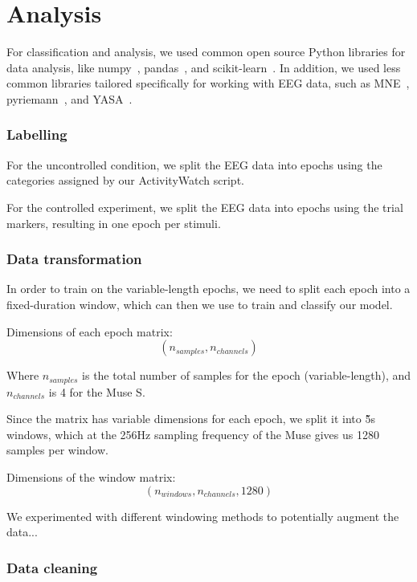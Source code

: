 \section{Analysis}

    For classification and analysis, we used common open source Python libraries for data analysis, like numpy~\cite{harris2020array}, pandas~\cite{reback2020pandas}, and scikit-learn~\cite{scikit-learn}. In addition, we used less common libraries tailored specifically for working with EEG data, such as MNE~\cite{noauthor_mne-python_2020}, pyriemann~\cite{alexandre_barachant_2020_3715511}, and YASA~\cite{vallat_yasa_2020}.

    \subsubsection{Labelling}
        For the uncontrolled condition, we split the EEG data into epochs using the categories assigned by our ActivityWatch script.

        For the controlled experiment, we split the EEG data into epochs using the trial markers, resulting in one epoch per stimuli.

    \subsubsection{Data transformation}

        In order to train on the variable-length epochs, we need to split each epoch into a fixed-duration window, which can then we use to train and classify our model.

        Dimensions of each epoch matrix: \[ (n_{samples}, n_{channels}) \]

        Where $n_{samples}$ is the total number of samples for the epoch (variable-length), and $n_{channels}$ is 4 for the Muse S.

        Since the matrix has variable dimensions for each epoch, we split it into \~5s windows, which at the 256Hz sampling frequency of the Muse gives us 1280 samples per window.

        Dimensions of the window matrix: \[ (n_{windows}, n_{channels}, 1280) \]

        We experimented with different windowing methods to potentially augment the data...  

    \subsubsection{Data cleaning}

